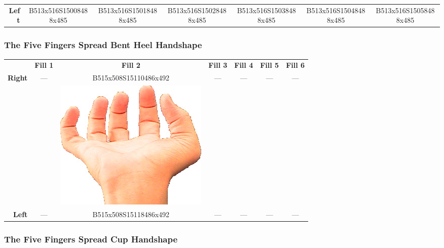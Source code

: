 \documentclass{article}
\begin{document}
\begin{center}
\begin{tabular}{r*{6}{c}}
\textbf{Left}&
B513x516S15008488x485&
B513x516S15018488x485&
B513x516S15028488x485&
B513x516S15038488x485&
B513x516S15048488x485&
B513x516S15058488x485\\
\end{tabular}
\end{center}

\subsubsection{The Five Fingers Spread Bent Heel Handshape}

\begin{center}
\begin{tabular}{r*{6}{c}}
&\textbf{Fill 1}&\textbf{Fill 2}&\textbf{Fill 3}&\textbf{Fill 4}&\textbf{Fill 5}&\textbf{Fill 6}\\
\multirow{2}{*}{\textbf{Right}}&
\multirow{2}{*}{---}&
B515x508S15110486x492&
\multirow{2}{*}{---}&
\multirow{2}{*}{---}&
\multirow{2}{*}{---}&
\multirow{2}{*}{---}\\
&
&
\includegraphics[scale=0.1]{images/05-06-2.jpg}\\
\textbf{Left}&
---&
B515x508S15118486x492&
---&
---&
---&
---\\
\end{tabular}
\end{center}

\subsubsection{The Five Fingers Spread Cup Handshape}
\end{document}
